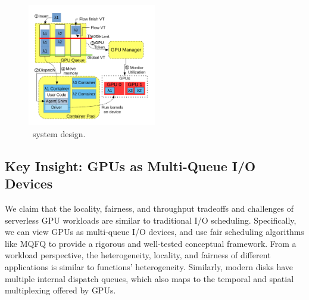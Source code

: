 \begin{figure}
  \includegraphics[width=0.5\textwidth]{../figs/queue-sys-2-simple.pdf}
  \vspace*{-0.8cm}
  \caption{\QName~system design.}
  \label{fig:sys-diag}
  \vspace{-0.6cm}
\end{figure}


\subsection{Key Insight: GPUs as Multi-Queue I/O Devices}

We claim that the locality, fairness, and throughput tradeoffs and challenges of serverless GPU workloads are similar to traditional I/O scheduling.
Specifically, we can view GPUs as multi-queue I/O devices, and use fair scheduling algorithms like MQFQ\cite{hedayati2019multi} to provide a rigorous and well-tested conceptual framework.
From a workload perspective, the heterogeneity, locality, and fairness of different applications is similar to functions' heterogeneity.
Similarly, modern disks have multiple internal dispatch queues, which also maps to the temporal and spatial multiplexing offered by GPUs. 

